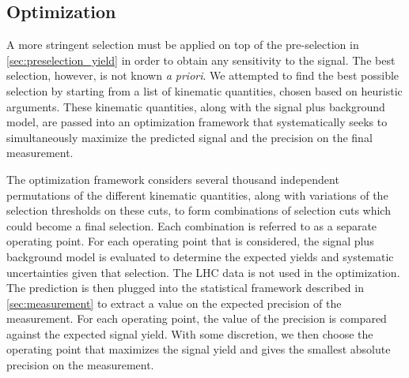 \subsection{Optimization}
\label{sec:optimization}

A more stringent selection must be applied on top of the pre-selection
in \sec\ref{sec:preselection_yield} in order to obtain any
sensitivity to the signal.  The best selection, however, is
not known \emph{a priori}. We attempted to find the best possible selection
by starting from a list of kinematic quantities, chosen based on heuristic
arguments. These kinematic quantities, along with the signal
plus background model, are passed into an optimization 
framework that systematically seeks to simultaneously 
maximize the predicted signal and the precision on the final measurement.

The optimization framework considers several thousand
independent permutations of the different
kinematic quantities, along with variations of the selection thresholds
on these cuts, to form combinations of selection cuts which could become a final
selection. 
Each combination is referred to as a separate operating point.
For each operating point
that is considered, the signal plus background
model is evaluated to determine the expected yields and systematic
uncertainties given that selection.  The LHC data is not used in the optimization.  
The prediction is then plugged into the statistical framework described in
\sec\ref{sec:measurement} to extract a value on the expected precision
of the measurement. For each operating point,
the value of the precision is compared against the expected signal yield.
With some discretion, we then choose the operating point 
that maximizes the signal yield and gives the smallest absolute 
precision on the measurement. 




